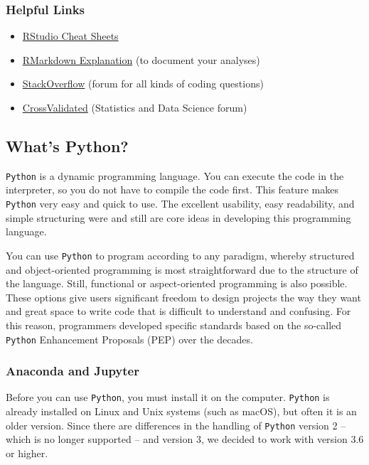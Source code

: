 \documentclass[
  11pt,
]{article}
\providecommand{\tightlist}{%
  \setlength{\itemsep}{0pt}\setlength{\parskip}{0pt}}
\begin{document}
\hypertarget{helpful-links}{%
\subsubsection{Helpful Links}\label{helpful-links}}

\begin{itemize}
\tightlist
\item
  \href{https://rstudio.cloud/learn/cheat-sheets}{RStudio Cheat Sheets}
\item
  \href{https://rmarkdown.rstudio.com/lesson-1.html}{RMarkdown Explanation} (to document your analyses)
\item
  \href{https://stackoverflow.com/}{StackOverflow} (forum for all kinds of coding questions)
\item
  \href{https://stats.stackexchange.com/}{CrossValidated} (Statistics and Data Science forum)
\end{itemize}

\hypertarget{whats-python}{%
\subsection{What's Python?}\label{whats-python}}

\texttt{Python} is a dynamic programming language.
You can execute the code in the interpreter, so you do not have to compile the code first.
This feature makes \texttt{Python} very easy and quick to use.
The excellent usability, easy readability, and simple structuring were and still are core ideas in developing this programming language.

You can use \texttt{Python} to program according to any paradigm, whereby structured and object-oriented programming is most straightforward due to the structure of the language.
Still, functional or aspect-oriented programming is also possible.
These options give users significant freedom to design projects the way they want and great space to write code that is difficult to understand and confusing.
For this reason, programmers developed specific standards based on the so-called \texttt{Python} Enhancement Proposals (PEP) over the decades.

\hypertarget{anaconda-and-jupyter}{%
\subsubsection{Anaconda and Jupyter}\label{anaconda-and-jupyter}}

Before you can use \texttt{Python}, you must install it on the computer.
\texttt{Python} is already installed on Linux and Unix systems (such as macOS), but often it is an older version.
Since there are differences in the handling of \texttt{Python} version 2 -- which is no longer supported -- and version 3, we decided to work with version 3.6 or higher.
\end{document}
